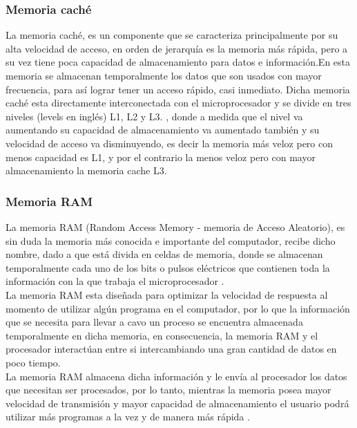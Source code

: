 \documentclass{article}
\begin{document}
\subsubsection{Memoria caché}
La memoria caché, es un componente que se caracteriza principalmente por su alta velocidad de acceso, en orden de jerarquía es la memoria más rápida, pero a su vez tiene poca capacidad de almacenamiento para datos e información.En esta memoria se almacenan temporalmente los datos que son usados con mayor frecuencia, para así lograr tener un acceso rápido, casi inmediato\cite{arquitectura}. Dicha memoria caché esta directamente interconectada con el microprocesador y se divide en tres niveles (levels en inglés) L1, L2 y L3. \cite{augusto}, donde a medida que el nivel va aumentando su capacidad de almacenamiento va aumentado también y su velocidad de acceso va disminuyendo, es decir la memoria más veloz pero con menos capacidad es L1, y por el contrario la menos veloz pero con mayor almacenamiento la memoria cache L3.

\subsubsection{Memoria RAM}
La memoria RAM (Random Access Memory - memoria de Acceso Aleatorio), es sin duda la memoria más conocida e importante del computador, recibe dicho nombre, dado a que está divida en celdas de memoria, donde se almacenan temporalmente cada uno de los bits o pulsos eléctricos que contienen toda la información con la que trabaja el microprocesador \cite{augusto}.\\

La memoria RAM esta diseñada para optimizar la velocidad de respuesta al momento de utilizar algún
programa en el computador, por lo que la información que se necesita para llevar a cavo un proceso se encuentra almacenada temporalmente en dicha memoria, en consecuencia, la memoria RAM y el procesador interactúan entre si intercambiando una gran cantidad de datos en poco tiempo.\\

La memoria RAM almacena dicha información y le envía al procesador los datos que necesitan
ser procesados, por lo tanto, mientras la memoria posea mayor velocidad de transmisión y
mayor capacidad de almacenamiento el usuario podrá utilizar más programas a la vez y de
manera más rápida \cite{apuntes}.\\\\

\noindent
\end{document}
